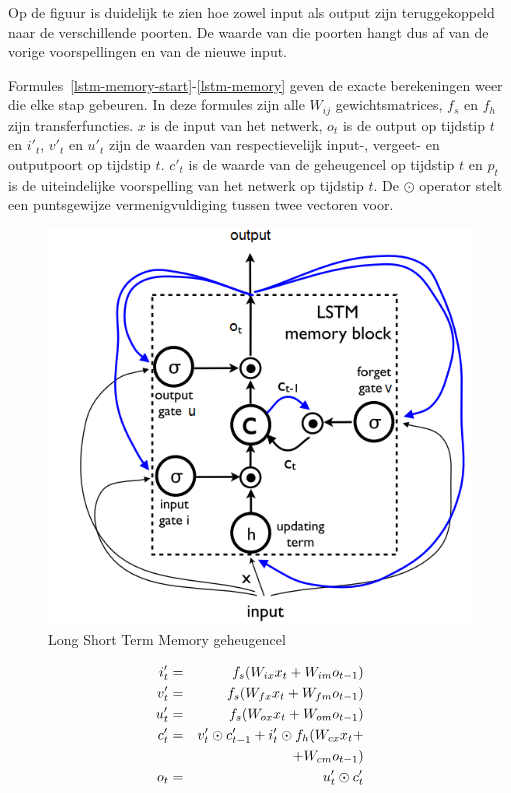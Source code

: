 Op de figuur is duidelijk te zien hoe zowel input als output zijn teruggekoppeld naar de verschillende poorten. De waarde van die poorten hangt dus af van de vorige voorspellingen en van de nieuwe input.

Formules~\eqref{lstm-memory-start}-\eqref{lstm-memory} geven de exacte berekeningen weer die elke stap gebeuren. In deze formules zijn alle $W_{ij}$ gewichtsmatrices, $f_s$ en $f_h$ zijn transferfuncties. $x$ is de input van het netwerk, $o_t$ is de output op tijdstip $t$ en $i'_t$, $v'_t$ en $u'_t$ zijn de waarden van respectievelijk input-, vergeet- en outputpoort op tijdstip $t$. $c'_t$ is de waarde van de geheugencel op tijdstip $t$ en $p_t$ is de uiteindelijke voorspelling van het netwerk op tijdstip $t$. De $\odot$ operator stelt een puntsgewijze vermenigvuldiging tussen twee vectoren voor.


\begin{figure}[tb]
    \centering
    \includegraphics[width=\linewidth]{Images/lstm.PNG}
    \caption[Long Short Term Memory geheugencel]{Long Short Term Memory geheugencel~\cite{Google}}
    \label{fig:lstm}
\end{figure}

\begin{eqnarray}
\vspace{-3mm}
\label{lstm-memory-start}
i_t' & = & f_s (W_{ix} x_t + W_{im} o_{t-1}) \label{lstm-input} \\
v_t' & = & f_s (W_{fx} x_t + W_{fm} o_{t-1}) \\
u_t' & = & f_s (W_{ox} x_t + W_{om} o_{t-1}) \\
c_t' & = & v_t' \odot c_{t-1}' + i_t' \odot f_h(W_{cx} x_t + \nonumber \\
&   & + W_{cm} o_{t-1}) \\
o_t & = & u_t' \odot c_t'
\label{lstm-memory}
\vspace{-3mm}
\end{eqnarray}

